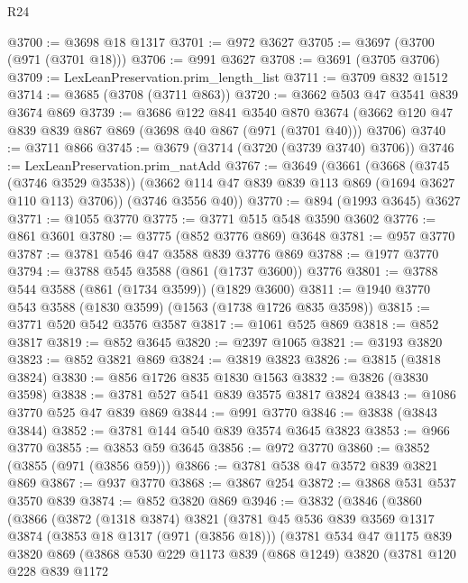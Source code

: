 \begin{lexlean}{R24}
\begin{coremodule}
@3700 := @3698 @18 @1317
@3701 := @972 @3627
@3705 := @3697 (@3700 (@971 (@3701 @18)))
@3706 := @991 @3627
@3708 := @3691 (@3705 @3706)
@3709 := LexLeanPreservation.prim_length_list
@3711 := @3709 @832 @1512
@3714 := @3685 (@3708 (@3711 @863))
@3720 := @3662 @503 @47 @3541 @839 @3674 @869
@3739 := @3686
    @122
    @841
    @3540
    @870
    @3674
    (@3662 @120 @47 @839 @839 @867 @869 (@3698 @40 @867 (@971 (@3701 @40))) @3706)
@3740 := @3711 @866
@3745 := @3679 (@3714 (@3720 (@3739 @3740) @3706))
@3746 := LexLeanPreservation.prim_natAdd
@3767 := @3649
    (@3661
      (@3668
        (@3745 (@3746 @3529 @3538))
        (@3662 @114 @47 @839 @839 @113 @869 (@1694 @3627 @110 @113) @3706))
      (@3746 @3556 @40))
@3770 := @894 (@1993 @3645) @3627
@3771 := @1055 @3770
@3775 := @3771 @515 @548 @3590 @3602
@3776 := @861 @3601
@3780 := @3775 (@852 @3776 @869) @3648
@3781 := @957 @3770
@3787 := @3781 @546 @47 @3588 @839 @3776 @869
@3788 := @1977 @3770
@3794 := @3788 @545 @3588 (@861 (@1737 @3600)) @3776
@3801 := @3788 @544 @3588 (@861 (@1734 @3599)) (@1829 @3600)
@3811 := @1940 @3770 @543 @3588 (@1830 @3599) (@1563 (@1738 @1726 @835 @3598))
@3815 := @3771 @520 @542 @3576 @3587
@3817 := @1061 @525 @869
@3818 := @852 @3817
@3819 := @852 @3645
@3820 := @2397 @1065
@3821 := @3193 @3820
@3823 := @852 @3821 @869
@3824 := @3819 @3823
@3826 := @3815 (@3818 @3824)
@3830 := @856 @1726 @835 @1830 @1563
@3832 := @3826 (@3830 @3598)
@3838 := @3781 @527 @541 @839 @3575 @3817 @3824
@3843 := @1086 @3770 @525 @47 @839 @869
@3844 := @991 @3770
@3846 := @3838 (@3843 @3844)
@3852 := @3781 @144 @540 @839 @3574 @3645 @3823
@3853 := @966 @3770
@3855 := @3853 @59 @3645
@3856 := @972 @3770
@3860 := @3852 (@3855 (@971 (@3856 @59)))
@3866 := @3781 @538 @47 @3572 @839 @3821 @869
@3867 := @937 @3770
@3868 := @3867 @254
@3872 := @3868 @531 @537 @3570 @839
@3874 := @852 @3820 @869
@3946 := @3832
    (@3846
      (@3860
        (@3866
          (@3872
            (@1318 @3874)
            @3821
            (@3781
              @45
              @536
              @839
              @3569
              @1317
              @3874
              (@3853 @18 @1317 (@971 (@3856 @18)))
              (@3781
                @534
                @47
                @1175
                @839
                @3820
                @869
                (@3868
                  @530
                  @229
                  @1173
                  @839
                  (@868 @1249)
                  @3820
                  (@3781
                    @120
                    @228
                    @839
                    @1172

\end{coremodule}
\end{lexlean}
